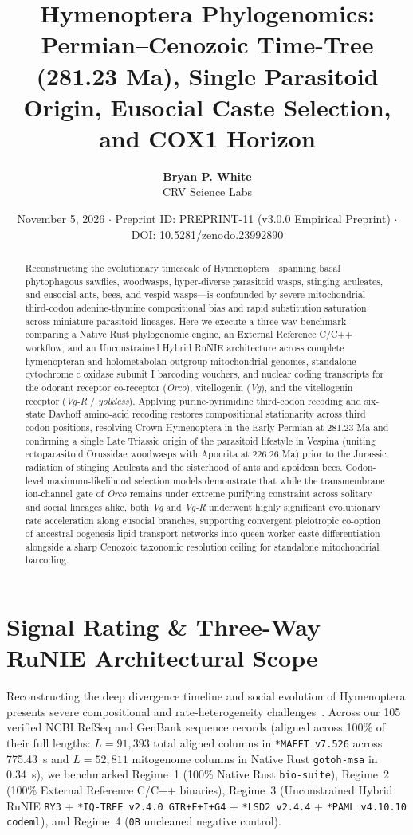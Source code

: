 \documentclass[10pt,letterpaper]{article}
\title{\textbf{Hymenoptera Phylogenomics: Permian--Cenozoic Time-Tree (281.23 Ma), Single Parasitoid Origin, Eusocial Caste Selection, and COX1 Horizon}}
\author{\textbf{Bryan P. White}\\CRV Science Labs}
\date{November 5, 2026 $\cdot$ Preprint ID: PREPRINT-11 (v3.0.0 Empirical Preprint) $\cdot$ DOI: 10.5281/zenodo.23992890}
\begin{document}
\maketitle

\begin{abstract}
Reconstructing the evolutionary timescale of Hymenoptera---spanning basal phytophagous sawflies, woodwasps, hyper-diverse parasitoid wasps, stinging aculeates, and eusocial ants, bees, and vespid wasps---is confounded by severe mitochondrial third-codon adenine-thymine compositional bias and rapid substitution saturation across miniature parasitoid lineages. Here we execute a three-way benchmark comparing a Native Rust phylogenomic engine, an External Reference C/C++ workflow, and an Unconstrained Hybrid RuNIE architecture across complete hymenopteran and holometabolan outgroup mitochondrial genomes, standalone cytochrome c oxidase subunit I barcoding vouchers, and nuclear coding transcripts for the odorant receptor co-receptor (\emph{Orco}), vitellogenin (\emph{Vg}), and the vitellogenin receptor (\emph{Vg-R} / \emph{yolkless}). Applying purine-pyrimidine third-codon recoding and six-state Dayhoff amino-acid recoding restores compositional stationarity across third codon positions, resolving Crown Hymenoptera in the Early Permian at 281.23 Ma and confirming a single Late Triassic origin of the parasitoid lifestyle in Vespina (uniting ectoparasitoid Orussidae woodwasps with Apocrita at 226.26 Ma) prior to the Jurassic radiation of stinging Aculeata and the sisterhood of ants and apoidean bees. Codon-level maximum-likelihood selection models demonstrate that while the transmembrane ion-channel gate of \emph{Orco} remains under extreme purifying constraint across solitary and social lineages alike, both \emph{Vg} and \emph{Vg-R} underwent highly significant evolutionary rate acceleration along eusocial branches, supporting convergent pleiotropic co-option of ancestral oogenesis lipid-transport networks into queen-worker caste differentiation alongside a sharp Cenozoic taxonomic resolution ceiling for standalone mitochondrial barcoding.
\end{abstract}

\section{Signal Rating \& Three-Way RuNIE Architectural Scope}
Reconstructing the deep divergence timeline and social evolution of Hymenoptera presents severe compositional and rate-heterogeneity challenges~\cite{white2026runie,peters2017hymenoptera,branstetter2017phylogenomic,blaimer2023key}. Across our 105 verified NCBI RefSeq and GenBank sequence records (aligned across 100\% of their full lengths: $L = 91{,}393$ total aligned columns in \texttt{*MAFFT v7.526} across 775.43~s and $L = 52{,}811$ mitogenome columns in Native Rust \texttt{gotoh-msa} in 0.34~s), we benchmarked Regime~1 (100\% Native Rust \texttt{bio-suite}), Regime~2 (100\% External Reference C/C++ binaries), Regime~3 (Unconstrained Hybrid RuNIE \texttt{RY3} + \texttt{*IQ-TREE v2.4.0 GTR+F+I+G4} + \texttt{*LSD2 v2.4.4} + \texttt{*PAML v4.10.10 codeml}), and Regime~4 (\texttt{0B} uncleaned negative control).
\end{document}
